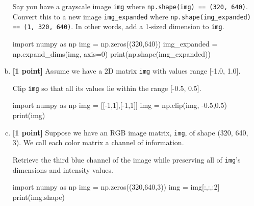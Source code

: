\documentclass[11pt]{article}
\begin{document}
\begin{enumerate}[(a)]
    \begin{tcolorbox}[colback=orange!5!white,colframe=orange!75!black]
    Say you have a grayscale image \texttt{img} where \texttt{np.shape(img) == (320, 640)}. Convert this to a new image \texttt{img\_expanded} where \texttt{np.shape(img\_expanded) == (1, 320, 640)}. In other words, add a 1-sized dimension to \texttt{img}.
    \end{tcolorbox}

\begin{tcolorbox}[colback=white!5!white,colframe=green!75!black,height=2cm]
    \begin{python}
    import numpy as np
    img = np.zeros((320,640))
    img_expanded = np.expand_dims(img, axis=0)
    print(np.shape(img_expanded))
    \end{python}
    \end{tcolorbox}
    
    \item \textbf{[1 point]} Assume we have a 2D matrix \texttt{img} with values range [-1.0, 1.0]. 
    \begin{tcolorbox}[colback=orange!5!white,colframe=orange!75!black]
    Clip \texttt{img} so that all its values lie within the range [-0.5, 0.5].
    \end{tcolorbox}

    \begin{tcolorbox}[colback=white!5!white,colframe=green!75!black,height=2cm]
    \begin{python}
    import numpy as np
    img = [[-1,1],[-1,1]]
    img = np.clip(img, -0.5,0.5)
    print(img)
    \end{python}
    \end{tcolorbox}
    
    \item \textbf{[1 point]} Suppose we have an RGB image matrix, \texttt{img}, of shape (320, 640, 3). We call each color matrix a channel of information.
    \begin{tcolorbox}[colback=orange!5!white,colframe=orange!75!black]
    Retrieve the third blue channel of the image while preserving all of \texttt{img}'s dimensions and intensity values.
    \end{tcolorbox}
    
    \begin{tcolorbox}[colback=white!5!white,colframe=green!75!black,height=2cm]
    \begin{python}
    import numpy as np
    img = np.zeros((320,640,3))
    img = img[:,:,:2]
    print(img.shape)
    \end{python}
    \end{tcolorbox}


\end{enumerate}
\end{document}
